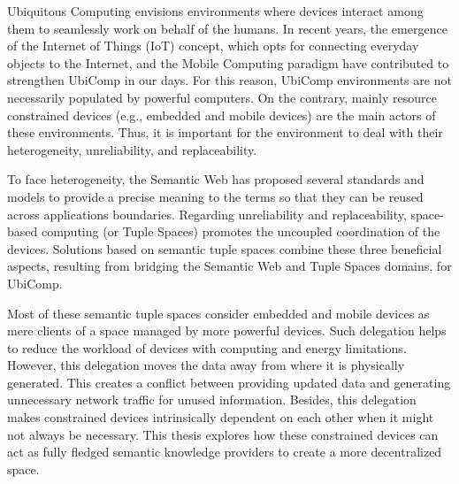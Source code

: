 




\begin{abstracts}        %
Ubiquitous Computing envisions environments where devices interact among them to seamlessly work on behalf of the humans.
In recent years, the emergence of the Internet of Things (IoT) concept, which opts for connecting everyday objects to the Internet, and the Mobile Computing paradigm have contributed to strengthen UbiComp in our days.
For this reason, UbiComp environments are not necessarily populated by powerful computers.
On the contrary, mainly resource constrained devices (e.g., embedded and mobile devices) are the main actors of these environments.
Thus, it is important for the environment to deal with their heterogeneity, unreliability, and replaceability.


To face heterogeneity, the Semantic Web has proposed several standards and models to provide a precise meaning to the terms so that they can be reused across applications boundaries.
Regarding unreliability and replaceability, space-based computing (or Tuple Spaces) promotes the uncoupled coordination of the devices.
Solutions based on semantic tuple spaces combine these three beneficial aspects, resulting from bridging the Semantic Web and Tuple Spaces domains, for UbiComp.

Most of these semantic tuple spaces consider embedded and mobile devices as mere clients of a space managed by more powerful devices.
Such delegation helps to reduce the workload of devices with computing and energy limitations.
However,  this delegation moves the data away from where it is physically generated.
This creates a conflict between providing updated data and generating unnecessary network traffic for unused information.
Besides, this delegation makes constrained devices intrinsically dependent on each other when it might not always be necessary.
This thesis explores how these constrained devices can act as fully fledged semantic knowledge providers to create a more decentralized space.


\end{abstracts}
